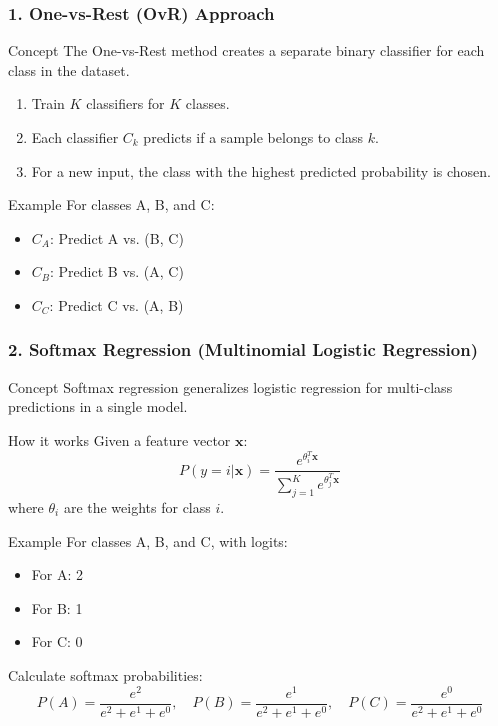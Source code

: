 \documentclass[aspectratio=169]{beamer}
\begin{document}
\begin{frame}[fragile]
    \frametitle{1. One-vs-Rest (OvR) Approach}
    \begin{block}{Concept}
        The One-vs-Rest method creates a separate binary classifier for each class in the dataset.
    \end{block}

    \begin{enumerate}
        \item Train \( K \) classifiers for \( K \) classes.
        \item Each classifier \( C_k \) predicts if a sample belongs to class \( k \).
        \item For a new input, the class with the highest predicted probability is chosen.
    \end{enumerate}

    \begin{block}{Example}
        For classes A, B, and C:
        \begin{itemize}
            \item \( C_A \): Predict A vs. (B, C)
            \item \( C_B \): Predict B vs. (A, C)
            \item \( C_C \): Predict C vs. (A, B)
        \end{itemize}
    \end{block}
\end{frame}

\begin{frame}[fragile]
    \frametitle{2. Softmax Regression (Multinomial Logistic Regression)}
    \begin{block}{Concept}
        Softmax regression generalizes logistic regression for multi-class predictions in a single model.
    \end{block}

    \begin{block}{How it works}
        Given a feature vector \( \mathbf{x} \):
        \[
            P(y = i | \mathbf{x}) = \frac{e^{\theta_i^T \mathbf{x}}}{\sum_{j=1}^{K} e^{\theta_j^T \mathbf{x}}}
        \]
        where \( \theta_i \) are the weights for class \( i \).
    \end{block}

    \begin{block}{Example}
        For classes A, B, and C, with logits:
        \begin{itemize}
            \item For A: 2
            \item For B: 1
            \item For C: 0
        \end{itemize}
        Calculate softmax probabilities:
        \[
            P(A) = \frac{e^2}{e^2 + e^1 + e^0}, \quad P(B) = \frac{e^1}{e^2 + e^1 + e^0}, \quad P(C) = \frac{e^0}{e^2 + e^1 + e^0}
        \]
    \end{block}
\end{frame}
\end{document}
